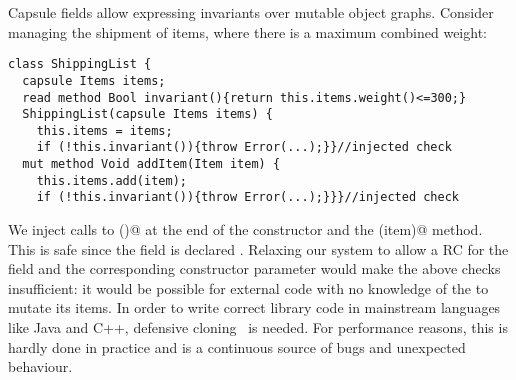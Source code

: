 Capsule fields allow expressing invariants over mutable object graphs.
Consider managing the shipment of items, where there is a maximum combined weight:
\begin{lstlisting}
class ShippingList {
  capsule Items items;
  read method Bool invariant(){return this.items.weight()<=300;}
  ShippingList(capsule Items items) {
    this.items = items;
    if (!this.invariant()){throw Error(...);}}//injected check
  mut method Void addItem(Item item) {
    this.items.add(item);
    if (!this.invariant()){throw Error(...);}}}//injected check
\end{lstlisting}
We inject calls to \Q@invariant()@ at the end of the constructor and the \Q@addItem(item)@ method.
This is safe since the \Q@items@ field is declared \Q@capsule@.
Relaxing our system to allow a \Q@mut@ RC for
the \Q@items@ field and the corresponding constructor parameter would 
make the above checks insufficient:
it would be possible for external code with no knowledge of the \Q@ShippingList@ to mutate its items. 
In order to write correct library code in mainstream languages like Java and C++, defensive cloning~\cite{Bloch08} is needed.
For performance reasons, this is hardly done in practice and is a continuous source of bugs and unexpected behaviour.%

